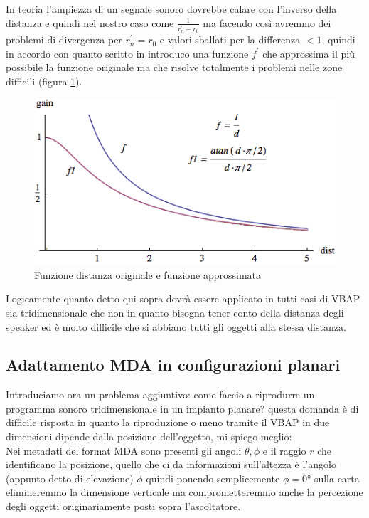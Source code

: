 \documentclass[12pt,a4paper]{report}
\begin{document}
In teoria l'ampiezza di un segnale sonoro dovrebbe calare con l'inverso della distanza e quindi nel nostro caso come $\frac{1}{r_n^{\prime}-r_0}$ ma facendo così avremmo dei problemi di divergenza per $r_n^{\prime}=r_0$ e valori sballati per la differenza $<1$, quindi in accordo con quanto scritto in \cite{distanza} introduco una funzione $f^{\prime}$ che approssima il più possibile la funzione originale ma che risolve totalmente i problemi nelle zone difficili (figura \ref{fig:distance}).\\

\begin{figure}[htbp]
	\centering
	\includegraphics[scale=0.60]{figures/distance.png}
	\caption {Funzione distanza originale e funzione approssimata} 
	\label{fig:distance}
	\end{figure} 

Logicamente quanto detto qui sopra dovrà essere applicato in tutti casi di VBAP sia tridimensionale che non in quanto bisogna tener conto della distanza degli speaker ed è molto difficile che si abbiano tutti gli oggetti alla stessa distanza.\\

\subsection{Adattamento MDA in configurazioni planari}

Introduciamo ora un problema aggiuntivo: come faccio a riprodurre un programma sonoro tridimensionale in un impianto planare? questa domanda è di difficile risposta in quanto la riproduzione o meno tramite il VBAP in due dimensioni dipende dalla posizione dell'oggetto, mi spiego meglio:\\

Nei metadati del format MDA sono presenti gli angoli $\theta, \phi$ e il raggio $r$ che identificano la posizione, quello che ci da informazioni sull'altezza è l'angolo (appunto detto di elevazione) $\phi$ quindi ponendo semplicemente $\phi=0°$ sulla carta elimineremmo la dimensione verticale ma comprometteremmo anche la percezione degli oggetti originariamente posti sopra l'ascoltatore.\\
\end{document}
